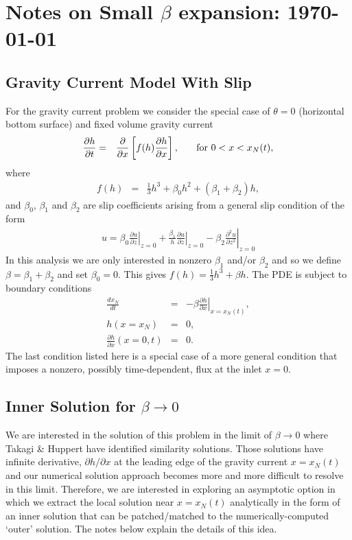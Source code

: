\documentclass[11pt]{article}
\newcommand{\bea}{\begin{eqnarray}}
\newcommand{\eea}{\end{eqnarray}}
\begin{document}
\section{Notes on Small $\beta$ expansion: \today}

{\color{red}{DMA: Still need to edit this part ... May 2020}}

\subsection{Gravity Current Model With Slip}

For the gravity current problem we consider the special case of $\theta =0$ (horizontal bottom surface) and fixed volume gravity current
\bea
\frac{\partial h}{\partial t} & = & \frac{\partial }{\partial x} \left[ f(h) \frac{\partial h}{\partial x} \right],\hspace{0.25in}\mbox{for $0 < x < x_N(t)$},
\eea
where
\bea
f(h) & = & \frac{1}{3} h^3 + \beta_0 h^2 + (\beta_1 + \beta_2) h,
\eea
and $\beta_0$, $\beta_1$ and $\beta_2$ are slip coefficients arising from a general slip condition of the form
\bea
u = \beta_0 \left. \frac{\partial u}{\partial z} \right|_{z=0}+ \frac{\beta_1}{h} \left. \frac{\partial u}{\partial z} \right|_{z=0}- \beta_2 \left. \frac{\partial^2 u}{\partial z^2}  \right|_{z=0}
\eea
In this analysis we are only interested in nonzero $\beta_1$ and/or $\beta_2$ and so we define $\beta = \beta_1 + \beta_2$ and set $\beta_0=0$.
This gives $f(h) = \frac{1}{3} h^3 + \beta h$.
The PDE is subject to boundary conditions
\bea
\frac{dx_N}{dt} & = & - \beta \left. \frac{\partial h}{\partial x} \right|_{x=x_N(t)},\\
h(x=x_N) & = & 0, \\
\frac{\partial h}{\partial x}(x=0,t) & = & 0.
\eea
The last condition listed here is a special case of a more general condition that imposes a nonzero, possibly time-dependent, flux at the inlet $x=0$.

\subsection{Inner Solution for $\beta \rightarrow 0$}

We are interested in the solution of this problem in the limit of $\beta \rightarrow 0$ where Takagi \& Huppert have identified similarity solutions.  Those solutions have
infinite derivative, $\partial h/\partial x$ at the leading edge of the gravity current $x=x_N(t)$ and our numerical solution approach becomes more and more difficult to resolve  in this limit.  Therefore, we are interested in exploring an asymptotic option in which we extract the local solution near $x=x_N(t)$ analytically in the form of an inner solution that can be patched/matched to the numerically-computed `outer' solution.  The notes below explain the details of this idea.
\end{document}
